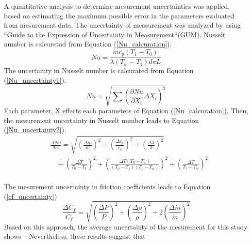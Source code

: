 \documentclass[conference]{IEEEtran}
\begin{document}
A quantitative analysis to determine mesurement uncertainties was applied,
based on estimating the maximum possible error in the parameters evaluated from mesurement data.
The uncertainty of measurement was analyzed by using ``Guide to the Expression of Uncertainty in Measurement``(GUM).
Nusselt number is calcuretad from Equation (\ref{Nu_calcuration}).
\begin{equation}
    Nu=\frac{\dot{m} c_{p}(T_{1}-T_{0})}{\lambda (T_{w}-T_{1}) d\pi L}\label{Nu_calcuration}
\end{equation}
The uncertainty in Nusselt number is calcurated from Equation (\ref{Nu_uncertainty1}).
\begin{equation}
    Nu=\sqrt{\sum \left(\frac{\partial Nu}{\partial X_{i}} \Delta X_{i}\right)^{2}}\label{Nu_uncertainty1}
\end{equation}
Each parameter, X effects each parameters of Equation (\ref{Nu_calcuration}).
Then, the mesurement uncertainty in Nusselt number leads to Equation (\ref{Nu_uncertainty2}).
\begin{equation}
    \begin{split}
        &\frac{\Delta Nu}{Nu} =\sqrt{\left(\frac{\Delta \dot{m}}{\dot{m}}\right)^{2}+\left(\frac{\Delta c_{p}}{c_{p}}\right)^{2}+\left(\frac{\Delta \lambda}{\lambda}\right)^{2}}\\
        &\quad +\left(\frac{\Delta T}{T_{0}-T_{1}}\right)^{2}+\left(\frac{\Delta T(T_{0}-T_{w})}{(T_{0}-T_{1})(T_{1}-T_{w})}\right)^{2}+\left(\frac{\Delta T}{T_{1}-T_{w}}\right)^{2}\\
        \label{Nu_uncertainty2}
    \end{split}
\end{equation}

The mesurement uncertainty in friction coefficients leads to Equation (\ref{cf_uncertainty})
\begin{equation}
    \frac{\Delta C_{f}}{C_{f}} = \sqrt{\left(\frac{\Delta P}{P}\right)^{2}+\left(\frac{\Delta \rho}{\rho}\right)^{2}+2\left(\frac{\Delta \dot{m}}{\dot{m}}\right)^{2}}
    \label{cf_uncertainty}
\end{equation}
Based on this approach, the average uncertainty of the mesurement for this study shows --
Nevertheless, these results suggest that
\end{document}
